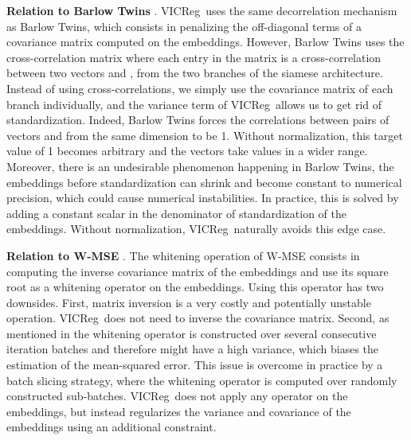 \documentclass{article}
\newcommand{\algo}{VICReg}
\begin{document}
\vspace{2mm}
\textbf{Relation to Barlow Twins} \cite{zbontar2021barlow}. \algo \ uses the same decorrelation mechanism as Barlow Twins, which consists in penalizing the off-diagonal terms of a covariance matrix computed on the embeddings. However, Barlow Twins uses the cross-correlation matrix where each entry in the matrix is a cross-correlation between two vectors  and , from the two branches of the siamese architecture. Instead of using cross-correlations, we simply use the covariance matrix of each branch individually, and the variance term of \algo \ allows us to get rid of standardization. Indeed, Barlow Twins forces the correlations between pairs of vectors  and  from the same dimension  to be 1. Without normalization, this target value of 1 becomes arbitrary and the vectors take values in a wider range. Moreover, there is an undesirable phenomenon happening in Barlow Twins, the embeddings before standardization can shrink and become constant to numerical precision, which could cause numerical instabilities. In practice, this is solved by adding a constant scalar in the denominator of standardization of the embeddings. Without normalization, \algo \ naturally avoids this edge case.

\vspace{2mm}
\textbf{Relation to W-MSE} \cite{ermolov2021whitening}. The whitening operation of W-MSE consists in computing the inverse covariance matrix of the embeddings and use its square root as a whitening operator on the embeddings. Using this operator has two downsides. First, matrix inversion is a very costly and potentially unstable operation. \algo \ does not need to inverse the covariance matrix. Second, as mentioned in \cite{ermolov2021whitening} the whitening operator is constructed over several consecutive iteration batches and therefore might have a high variance, which biases the estimation of the mean-squared error. This issue is overcome in practice by a batch slicing strategy, where the whitening operator is computed over randomly constructed sub-batches. \algo \ does not apply any operator on the embeddings, but instead regularizes the variance and covariance of the embeddings using an additional constraint.
\end{document}

